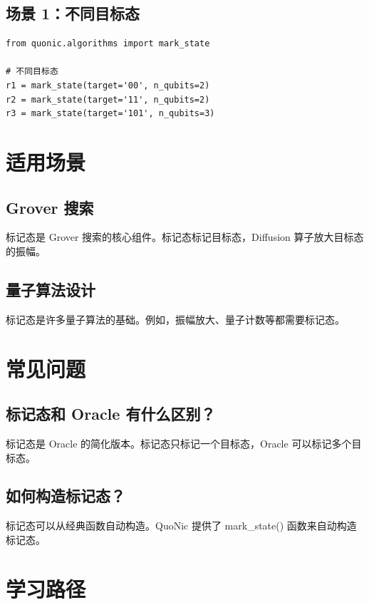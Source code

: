 \documentclass[12pt,a4paper]{article}
\begin{document}
\subsection{场景 1：不同目标态}

\begin{verbatim}
from quonic.algorithms import mark_state

# 不同目标态
r1 = mark_state(target='00', n_qubits=2)
r2 = mark_state(target='11', n_qubits=2)
r3 = mark_state(target='101', n_qubits=3)
\end{verbatim}

\section{适用场景}

\subsection{Grover 搜索}

标记态是 Grover 搜索的核心组件。标记态标记目标态，Diffusion 算子放大目标态的振幅。

\subsection{量子算法设计}

标记态是许多量子算法的基础。例如，振幅放大、量子计数等都需要标记态。

\section{常见问题}

\subsection{标记态和 Oracle 有什么区别？}

标记态是 Oracle 的简化版本。标记态只标记一个目标态，Oracle 可以标记多个目标态。

\subsection{如何构造标记态？}

标记态可以从经典函数自动构造。QuoNic 提供了 mark\_state() 函数来自动构造标记态。

\section{学习路径}
\end{document}
